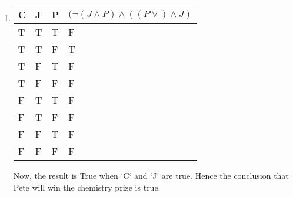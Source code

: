 \begin{solution}
    \begin{enumerate}[label=(\alph*)]
        \item {
            \begin{tabular}[c]{l l l | l}
                C & J & P & $(\neg(J \wedge P) \wedge ((P \vee) \wedge J)$ \\ \hline
                T & T & T & F \\
                T & T & F & T \\
                T & F & T & F \\
                T & F & F & F \\
                F & T & T & F \\
                F & T & F & F \\
                F & F & T & F \\
                F & F & F & F \\
            \end{tabular}
            Now, the result is True when `C` and `J` are true. Hence the conclusion that Pete will win the chemistry prize is true.
        }
        

\end{enumerate}
\end{solution}
